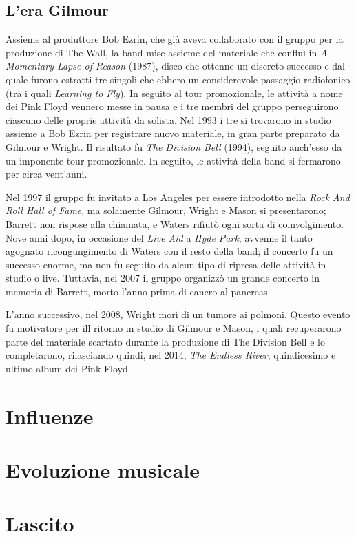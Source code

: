 \documentclass[class=book, crop=false, oneside, 12pt]{standalone}
\begin{document}
    \subsection{L'era Gilmour}
    Assieme al produttore Bob Ezrin, che già aveva collaborato con il gruppo per la produzione di The Wall, la band mise assieme del materiale che confluì in \emph{A Momentary Lapse of Reason} (1987), disco che ottenne un discreto successo e dal quale furono estratti tre singoli che ebbero un considerevole passaggio radiofonico (tra i quali \emph{Learning to Fly}). In seguito al tour promozionale, le attività a nome dei Pink Floyd vennero messe in pausa  e i tre membri del gruppo perseguirono ciascuno delle proprie attività da solista. Nel 1993 i tre si trovarono in studio assieme a Bob Ezrin per registrare nuovo materiale, in gran parte preparato da Gilmour e Wright. Il risultato fu \emph{The Division Bell} (1994), seguito anch'esso da un imponente tour promozionale. In seguito, le attività della band si fermarono per circa vent'anni.

    Nel 1997 il gruppo fu invitato a Los Angeles per essere introdotto nella \emph{Rock And Roll Hall of Fame}, ma solamente Gilmour, Wright e Mason si presentarono; Barrett non rispose alla chiamata, e Waters rifiutò ogni sorta di coinvolgimento. Nove anni dopo, in occasione del \emph{Live Aid} a \emph{Hyde Park}, avvenne il tanto agognato ricongungimento di Waters con il resto della band; il concerto fu un successo enorme, ma non fu seguito da alcun tipo di ripresa delle attività in studio o live. Tuttavia, nel 2007 il gruppo organizzò un grande concerto in memoria di Barrett, morto l'anno prima di cancro al pancreas.

    L'anno successivo, nel 2008, Wright morì di un tumore ai polmoni. Questo evento fu motivatore per ill ritorno in studio di Gilmour e Mason, i quali recuperarono parte del materiale scartato durante la produzione di The Division Bell e lo completarono, rilasciando quindi, nel 2014, \emph{The Endless River}, quindicesimo e ultimo album dei Pink Floyd.
    

    \section{Influenze}
    \section{Evoluzione musicale}
    \section{Lascito}
\end{document}
